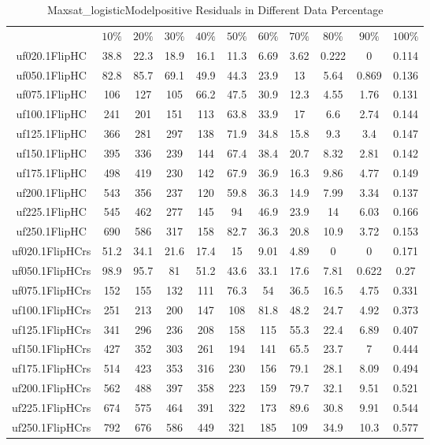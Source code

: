 \begin{table}[htbp]
\caption{Maxsat_logisticModelpositive Residuals in Different Data Percentage}
\centering
\begin{tabular}{|ccccccccccc|}
\hline
 & $10\%$ & $20\%$ & $30\%$ & $40\%$ & $50\%$ & $60\%$ & $70\%$ & $80\%$ & $90\%$ & $100\%$ \\
uf020.1FlipHC & 38.8 & 22.3 & 18.9 & 16.1 & 11.3 & 6.69 & 3.62 & 0.222 &    0 & 0.114 \\
uf050.1FlipHC & 82.8 & 85.7 & 69.1 & 49.9 & 44.3 & 23.9 &   13 & 5.64 & 0.869 & 0.136 \\
uf075.1FlipHC &  106 &  127 &  105 & 66.2 & 47.5 & 30.9 & 12.3 & 4.55 & 1.76 & 0.131 \\
uf100.1FlipHC &  241 &  201 &  151 &  113 & 63.8 & 33.9 &   17 &  6.6 & 2.74 & 0.144 \\
uf125.1FlipHC &  366 &  281 &  297 &  138 & 71.9 & 34.8 & 15.8 &  9.3 &  3.4 & 0.147 \\
uf150.1FlipHC &  395 &  336 &  239 &  144 & 67.4 & 38.4 & 20.7 & 8.32 & 2.81 & 0.142 \\
uf175.1FlipHC &  498 &  419 &  230 &  142 & 67.9 & 36.9 & 16.3 & 9.86 & 4.77 & 0.149 \\
uf200.1FlipHC &  543 &  356 &  237 &  120 & 59.8 & 36.3 & 14.9 & 7.99 & 3.34 & 0.137 \\
uf225.1FlipHC &  545 &  462 &  277 &  145 &   94 & 46.9 & 23.9 &   14 & 6.03 & 0.166 \\
uf250.1FlipHC &  690 &  586 &  317 &  158 & 82.7 & 36.3 & 20.8 & 10.9 & 3.72 & 0.153 \\
uf020.1FlipHCrs & 51.2 & 34.1 & 21.6 & 17.4 &   15 & 9.01 & 4.89 &    0 &    0 & 0.171 \\
uf050.1FlipHCrs & 98.9 & 95.7 &   81 & 51.2 & 43.6 & 33.1 & 17.6 & 7.81 & 0.622 & 0.27 \\
uf075.1FlipHCrs &  152 &  155 &  132 &  111 & 76.3 &   54 & 36.5 & 16.5 & 4.75 & 0.331 \\
uf100.1FlipHCrs &  251 &  213 &  200 &  147 &  108 & 81.8 & 48.2 & 24.7 & 4.92 & 0.373 \\
uf125.1FlipHCrs &  341 &  296 &  236 &  208 &  158 &  115 & 55.3 & 22.4 & 6.89 & 0.407 \\
uf150.1FlipHCrs &  427 &  352 &  303 &  261 &  194 &  141 & 65.5 & 23.7 &    7 & 0.444 \\
uf175.1FlipHCrs &  514 &  423 &  353 &  316 &  230 &  156 & 79.1 & 28.1 & 8.09 & 0.494 \\
uf200.1FlipHCrs &  562 &  488 &  397 &  358 &  223 &  159 & 79.7 & 32.1 & 9.51 & 0.521 \\
uf225.1FlipHCrs &  674 &  575 &  464 &  391 &  322 &  173 & 89.6 & 30.8 & 9.91 & 0.544 \\
uf250.1FlipHCrs &  792 &  676 &  586 &  449 &  321 &  185 &  109 & 34.9 & 10.3 & 0.577 \\
\hline
\end{tabular}
\end{table}
